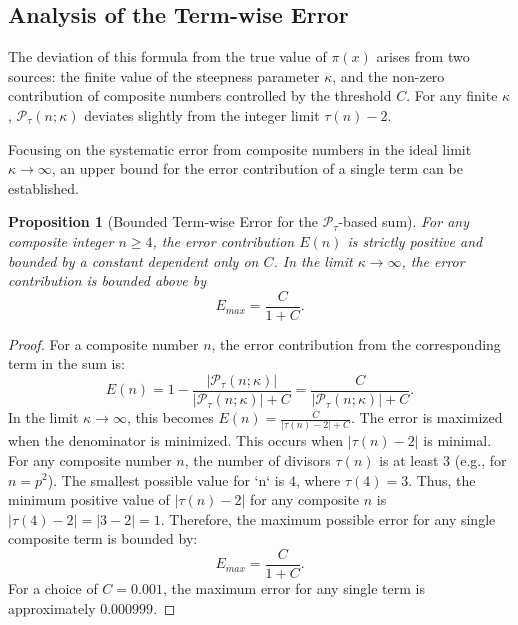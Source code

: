 \documentclass[11pt,a4paper]{amsart}
\theoremstyle{plain}
\newtheorem{proposition}[theorem]{Proposition}
\theoremstyle{definition}
\theoremstyle{remark}
\begin{document}
\subsection{Analysis of the Term-wise Error}
The deviation of this formula from the true value of $\pi(x)$ arises from two sources: the finite value of the steepness parameter $\kappa$, and the non-zero contribution of composite numbers controlled by the threshold $C$. For any finite $\kappa$, $\mathcal{P}_{\tau}(n; \kappa)$ deviates slightly from the integer limit $\tau(n)-2$.

Focusing on the systematic error from composite numbers in the ideal limit $\kappa\to\infty$, an upper bound for the error contribution of a single term can be established.

\begin{proposition}[Bounded Term-wise Error for the $\mathcal{P}_{\tau}$-based sum]
For any composite integer $n \ge 4$, the error contribution $E(n)$ is strictly positive and bounded by a constant dependent only on $C$. In the limit $\kappa\to\infty$, the error contribution is bounded above by
\[ E_{max} = \frac{C}{1+C}. \]
\end{proposition}

\begin{proof}
For a composite number $n$, the error contribution from the corresponding term in the sum is:
\[ E(n) = 1 - \frac{|\mathcal{P}_{\tau}(n; \kappa)|}{|\mathcal{P}_{\tau}(n; \kappa)| + C} = \frac{C}{|\mathcal{P}_{\tau}(n; \kappa)| + C}. \]
In the limit $\kappa\to\infty$, this becomes $E(n) = \frac{C}{|\tau(n)-2| + C}$.
The error is maximized when the denominator is minimized. This occurs when $|\tau(n)-2|$ is minimal. For any composite number $n$, the number of divisors $\tau(n)$ is at least 3 (e.g., for $n=p^2$). The smallest possible value for `n` is $4$, where $\tau(4)=3$. Thus, the minimum positive value of $|\tau(n)-2|$ for any composite $n$ is $|\tau(4)-2| = |3-2|=1$.
Therefore, the maximum possible error for any single composite term is bounded by:
\[ E_{max} = \frac{C}{1+C}. \]
For a choice of $C=0.001$, the maximum error for any single term is approximately $0.000999$.
\end{proof}
\end{document}
